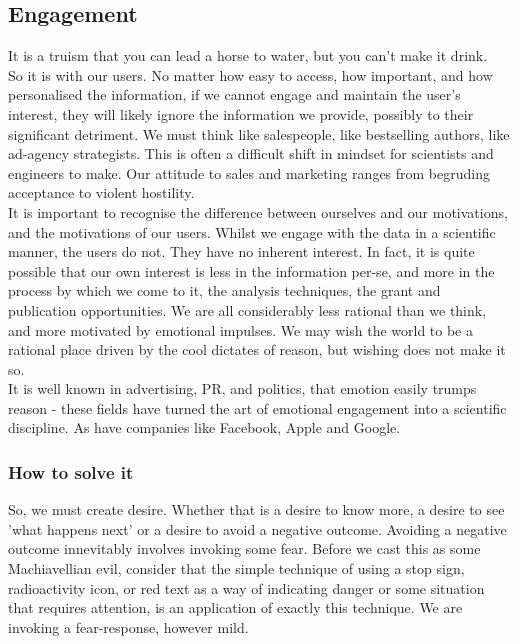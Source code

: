 \subsection{Engagement}
It is a truism that you can lead a horse to water, but you can't make it drink. \\

So it is with our users.
No matter how easy to access, how important, and how personalised the information, if we cannot engage and maintain the user's interest,
they will likely ignore the information we provide, possibly to their significant detriment.
We must think like salespeople, like bestselling authors, like ad-agency strategists.
This is often a difficult shift in mindset for scientists and engineers to make.
Our attitude to sales and marketing ranges from begruding acceptance to violent hostility. \\

It is important to recognise the difference between ourselves and our motivations, and the motivations of our users. Whilst we engage with the data in a scientific
manner, the users do not. They have no inherent interest. In fact, it is quite possible that our own interest is less in the information per-se, and more in the process
by which we come to it, the analysis techniques, the grant and publication opportunities. We are all considerably less rational than we think, and more motivated by
emotional impulses. We may wish the world to be a rational place driven by the cool dictates of reason, but wishing does not make it so. \\

It is well known in advertising, PR, and politics, that emotion easily trumps reason - these fields have turned the art of emotional engagement into a scientific discipline.
As have companies like Facebook, Apple and Google.

\subsubsection{How to solve it}

So, we must create desire. Whether that is a desire to know more, a desire to see 'what happens next' or a desire to avoid a negative outcome.
Avoiding a negative outcome innevitably involves invoking some fear. Before we cast this as some Machiavellian evil, consider that the simple
technique of using a stop sign, radioactivity icon, or red text as a way of indicating danger or some situation that requires attention, is an
application of exactly this technique. We are invoking a fear-response, however mild. \\

